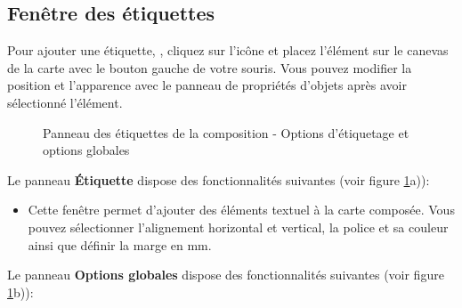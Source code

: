 \subsection{Fenêtre des étiquettes}

Pour ajouter une étiquette, , cliquez sur l'icône  et placez l'élément sur le canevas de la carte avec le bouton gauche de votre souris. Vous pouvez modifier la position et l'apparence avec le panneau de propriétés d'objets après avoir sélectionné l'élément.

\begin{figure}[ht]
\centering
   \hspace{1cm}
   \caption{Panneau des étiquettes de la composition - Options d'étiquetage et options globales \nixcaption}\label{fig:label_option}
\end{figure}


Le panneau \textbf{Étiquette} dispose des fonctionnalités suivantes (voir figure \ref{fig:label_option}a)):

\begin{itemize}[label=--]
\item Cette fenêtre permet d'ajouter des éléments textuel à la carte composée. Vous pouvez sélectionner l'alignement horizontal et vertical, la police et sa couleur ainsi que définir la marge en mm.
\end{itemize}


Le panneau \textbf{Options globales} dispose des fonctionnalités suivantes (voir figure \ref{fig:label_option}b)):

